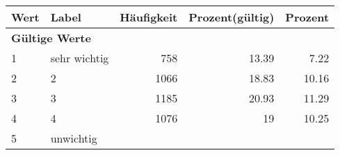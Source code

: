      \begin{longtable}{lXrrr}
     \toprule
     \textbf{Wert} & \textbf{Label} & \textbf{Häufigkeit} & \textbf{Prozent(gültig)} & \textbf{Prozent} \\
     \endhead
     \midrule
     \multicolumn{5}{l}{\textbf{Gültige Werte}}\\

     1 &
     \multicolumn{1}{X}{ sehr wichtig   } &


       \num{758} &
       \num[round-mode=places,round-precision=2]{13.39} &
         \num[round-mode=places,round-precision=2]{7.22} \\

     2 &
     \multicolumn{1}{X}{ 2   } &


       \num{1066} &
       \num[round-mode=places,round-precision=2]{18.83} &
         \num[round-mode=places,round-precision=2]{10.16} \\

     3 &
     \multicolumn{1}{X}{ 3   } &


       \num{1185} &
       \num[round-mode=places,round-precision=2]{20.93} &
         \num[round-mode=places,round-precision=2]{11.29} \\

     4 &
     \multicolumn{1}{X}{ 4   } &


       \num{1076} &
       \num[round-mode=places,round-precision=2]{19} &
         \num[round-mode=places,round-precision=2]{10.25} \\

     5 &
     \multicolumn{1}{X}{ unwichtig   } &



\end{longtable}
